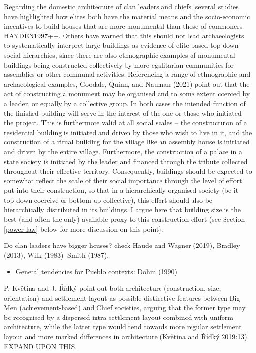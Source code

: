 \documentclass[
  12pt,
]{book}
\providecommand{\tightlist}{%
  \setlength{\itemsep}{0pt}\setlength{\parskip}{0pt}}
\begin{document}
Regarding the domestic architecture of clan leaders and chiefs, several studies have highlighted how elites both have the material means and the socio-economic incentives to build houses that are more monumental than those of commoners HAYDEN1997++. Others have warned that this should not lead archaeologists to systematically interpret large buildings as evidence of elite-based top-down social hierarchies, since there are also ethnographic examples of monumental buildings being constructed collectively by more egalitarian communities for assemblies or other communal activities. Referencing a range of ethnographic and archaeological examples, Goodale, Quinn, and Nauman (2021) point out that the act of constructing a monument may be organised and to some extent coerced by a leader, or equally by a collective group. In both cases the intended function of the finished building will serve in the interest of the one or those who initiated the project. This is furthermore valid at all social scales -- the constructuion of a residential building is initiated and driven by those who wish to live in it, and the construction of a ritual building for the village like an assembly house is initiated and driven by the entire village. Furthermore, the construction of a palace in a state society is initiated by the leader and financed through the tribute collected throughout their effective territory. Consequently, buildings should be expected to somewhat reflect the scale of their social importance through the level of effort put into their construction, so that in a hierarchically organised society (be it top-down coercive or bottom-up collective), this effort should also be hierarchically distributed in its buildings. I argue here that building size is the best (and often the only) available proxy to this construction effort (see Section \ref{power-law} below for more discussion on this point).

Do clan leaders have bigger houses? check Haude and Wagner (2019), Bradley (2013), Wilk (1983). Smith (1987).

\begin{itemize}
\tightlist
\item
  General tendencies for Pueblo contexts: Dohm (1990)
\end{itemize}

P. Květina and J. Řídký point out both architecture (construction, size, orientation) and settlement layout as possible distinctive features between Big Men (achievement-based) and Chief societies, arguing that the former type may be recognised by a dispersed intra-settlement layout combined with uniform architecture, while the latter type would tend towards more regular settlement layout and more marked differences in architecture (Květina and Řídký 2019:13). EXPAND UPON THIS.
\end{document}
